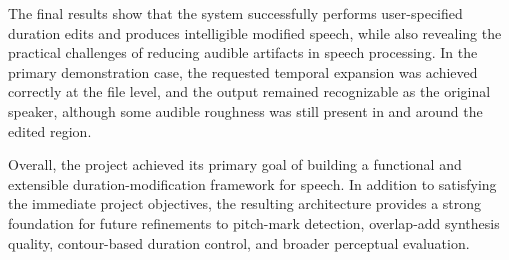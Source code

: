 \documentclass{article}
\begin{document}
The final results show that the system successfully performs user-specified duration edits and produces intelligible modified speech, while also revealing the practical challenges of reducing audible artifacts in speech processing. In the primary demonstration case, the requested temporal expansion was achieved correctly at the file level, and the output remained recognizable as the original speaker, although some audible roughness was still present in and around the edited region.

Overall, the project achieved its primary goal of building a functional and extensible duration-modification framework for speech. In addition to satisfying the immediate project objectives, the resulting architecture provides a strong foundation for future refinements to pitch-mark detection, overlap-add synthesis quality, contour-based duration control, and broader perceptual evaluation.
\end{document}
